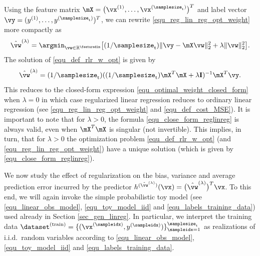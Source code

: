 \documentclass[12pt]{report}
\begin{document}
Using the feature matrix $\mX=\big(\vx^{(1)},\ldots,\vx^{(\samplesize_{\rm t})}\big)^{T}$ 
and label vector $\vy=(y^{(1)},\ldots,y^{(\samplesize_{\rm t})})^{T}$, 
we can rewrite \eqref{equ_reg_lin_reg_opt_weight} more compactly as 
\begin{equation} 
\label{equ_def_rlr_w_opt}
\hat{\vw}^{(\lambda)} = \argmin_{\vw \in \mathbb{R}^{\featuredim}} \big[ (1/\samplesize_{\rm t}) \| \vy - \mX \vw \|^{2}_{2} + \lambda \| \vw \|^{2}_{2}\big].
\end{equation} 
The solution of \eqref{equ_def_rlr_w_opt} is given by 
\begin{equation}
\label{equ_close_form_reglinreg}
\hat{\vw}^{(\lambda)} = (1/\samplesize_{\rm t}) ((1/\samplesize_{\rm t}) \mX^{T} \mX + \lambda \mathbf{I})^{-1} \mX^{T} \vy. 
\end{equation}
This reduces to the closed-form expression \eqref{equ_optimal_weight_closed_form} 
when $\lambda=0$ in which case regularized linear regression reduces to ordinary linear 
regression (see \eqref{equ_reg_lin_reg_opt_weight} and \eqref{equ_def_cost_MSE}). It 
is important to note that for $\lambda>0$, the formula \eqref{equ_close_form_reglinreg} 
is always valid, even when $\mX^{T} \mX$ is singular (not invertible). This implies, in turn, 
that for $\lambda> 0$ the optimization problem \eqref{equ_def_rlr_w_opt} (and \eqref{equ_reg_lin_reg_opt_weight}) 
have a unique solution (which is given by \eqref{equ_close_form_reglinreg}). 

We now study the effect of regularization on the bias, variance 
and average prediction error incurred by the predictor $h^{(\hat{\vw}^{(\lambda)})}(\vx) = \big(\hat{\vw}^{(\lambda)}\big)^{T} \vx$. 
To this end, we will again invoke the simple probabilistic toy 
model (see \eqref{equ_linear_obs_model}, \eqref{equ_toy_model_iid} 
and \eqref{equ_labels_training_data}) used already in Section \ref{sec_gen_linreg}. 
In particular, we interpret the training data $\dataset^{(\rm train)} = \{ (\vx^{(\sampleidx)},y^{(\sampleidx)}) \}_{\sampleidx=1}^{\samplesize_{\rm t}}$ 
as realizations of i.i.d.\ random variables according to \eqref{equ_linear_obs_model}, 
\eqref{equ_toy_model_iid} and \eqref{equ_labels_training_data}. 
\end{document}

